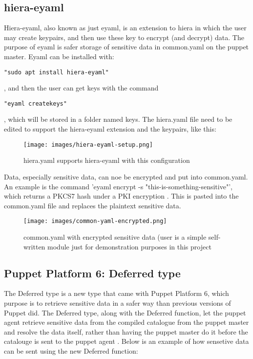 \subsection{hiera-eyaml}
Hiera-eyaml, also known as just eyaml, is an extension to hiera in which the user may create keypairs, and then use these key to encrypt (and decrypt) data. The purpose of eyaml is safer storage of sensitive data in common.yaml on the puppet master.
Eyaml can be installed with:
\begin{lstlisting}"sudo apt install hiera-eyaml"\end{lstlisting}, and then the user can get keys with the command \begin{lstlisting}"eyaml createkeys"\end{lstlisting}, which will be stored in a folder named keys. The hiera.yaml file need to be edited to support the hiera-eyaml extension and the keypairs, like this:

\begin{figure}[h!]
  \texttt{[image: images/hiera-eyaml-setup.png]}
  \caption{hiera.yaml supports hiera-eyaml with this configuration}
\end{figure}

\newpage

Data, especially sensitive data, can noe be encrypted and put into common.yaml. An example is the command 'eyaml encrypt -s "this-is-something-sensitive"', which returns a PKCS7 hash under a PKI encryption \cite{pkcs}. This is pasted into the common.yaml file and replaces the plaintext sensitive data.

\begin{figure}[h!]
  \texttt{[image: images/common-yaml-encrypted.png]}  \caption{common.yaml with encrypted sensitive data (user is a simple self-written module just for demonstration purposes in this project}
\end{figure}

\subsection{Puppet Platform 6: Deferred type}
The Deferred type is a new type that came with Puppet Platform 6, which purpose is to retrieve sensitive data in a safer way than previous versions of Puppet did. The Deferred type, along with the Deferred function, let the puppet agent retrieve sensitive data from the compiled catalogue from the puppet master and resolve the data itself, rather than having the puppet master do it before the catalouge is sent to the puppet agent \cite{deferred}.
Below is an example of how sensetive data can be sent using the new Deferred function:
\\

